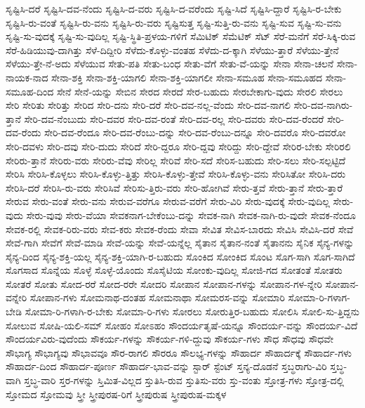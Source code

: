 {ಸೃಷ್ಟಿಸಿ-ದರೆ
ಸೃಷ್ಟಿಸಿ-ದವ-ನೆಂದು
ಸೃಷ್ಟಿಸಿ-ದ-ವರು
ಸೃಷ್ಟಿಸಿ-ದ-ವರೆಂದು
ಸೃಷ್ಟಿ-ಸಿದೆ
ಸೃಷ್ಟಿಸಿ-ದ್ದಾರೆ
ಸೃಷ್ಟಿಸಿ-ರ-ಬೇಕು
ಸೃಷ್ಟಿಸಿ-ರು-ವಂತೆ
ಸೃಷ್ಟಿಸಿ-ರು-ವನು
ಸೃಷ್ಟಿಸಿ-ರು-ವರು
ಸೃಷ್ಟಿಸುತ್ತ
ಸೃಷ್ಟಿ-ಸುತ್ತಿ-ರು-ವನು
ಸೃಷ್ಟಿ-ಸುವ
ಸೃಷ್ಟಿ-ಸು-ವನು
ಸೃಷ್ಟಿ-ಸು-ವುದಕ್ಕೆ
ಸೃಷ್ಟಿ-ಸು-ವುದಿಲ್ಲ
ಸೃಷ್ಟಿ-ಸ್ಥಿತಿ-ಪ್ರಳಯ-ಗಳಿಗೆ
ಸೆಮಿಟಿಕ್
ಸೆಮೆಟಿಕ್
ಸೆಟ್
ಸೆರೆ-ಮನೆಗೆ
ಸೆರೆ-ಸಿಕ್ಕಿ-ರುವ
ಸೆರೆ-ಹಿಡಿಯುವು-ದಾಗಿತ್ತು
ಸೆಳೆ-ದಿದ್ದೀರಿ
ಸೆಳೆದು-ಕೊಳ್ಳು-ವಂತಹ
ಸೆಳೆದು-ದ-ಕ್ಕಾಗಿ
ಸೆಳೆಯು-ತ್ತಾರೆ
ಸೆಳೆಯು-ತ್ತೇನೆ
ಸೆಳೆಯು-ತ್ತೇ-ನೆ-ಅದು
ಸೆಳೆಯುವ
ಸೇತು-ಪತಿ
ಸೇತು-ಬಂಧ
ಸೇತು-ವೆಗೆ
ಸೇತು-ವೆ-ಯನ್ನು
ಸೇನಾ
ಸೇನಾ-ಚಲನೆ
ಸೇನಾ-ನಾಯಕ-ನಾದ
ಸೇನಾ-ಶಕ್ತಿ
ಸೇನಾ-ಶಕ್ತಿ-ಯಾಗಲಿ
ಸೇನಾ-ಶಕ್ತಿ-ಯಾಗಲೀ
ಸೇನಾ-ಸಮೂಹ
ಸೇನಾ-ಸಮೂಹದ
ಸೇನಾ-ಸಮೂಹ-ದಿಂದ
ಸೇನೆ
ಸೇನೆ-ಯನ್ನು
ಸೇಬಿನ
ಸೇರದ
ಸೇರದೆ
ಸೇರ-ಬಹುದು
ಸೇರಬೇಕಾಗು-ವುದು
ಸೇರಲಿ
ಸೇರಲು
ಸೇರಿ
ಸೇರಿತು
ಸೇರಿತ್ತು
ಸೇರಿದ
ಸೇರಿ-ದನು
ಸೇರಿ-ದರೆ
ಸೇರಿ-ದವ-ನಲ್ಲ-ವೆಂದು
ಸೇರಿ-ದವ-ನಾಗಲಿ
ಸೇರಿ-ದವ-ನಾಗಿರು-ತ್ತಾನೆ
ಸೇರಿ-ದವ-ನೆಂಬುದು
ಸೇರಿ-ದವರ
ಸೇರಿ-ದವ-ರಂತೆ
ಸೇರಿ-ದವ-ರಲ್ಲ
ಸೇರಿ-ದವರು
ಸೇರಿ-ದವ-ರೆಂದರೆ
ಸೇರಿ-ದವ-ರೆಂದು
ಸೇರಿ-ದವ-ರೆಂದೂ
ಸೇರಿ-ದವ-ರೆಂಬು-ದನ್ನು
ಸೇರಿ-ದವ-ರೆಂಬು-ದನ್ನೂ
ಸೇರಿ-ದವರೊ
ಸೇರಿ-ದವರೋ
ಸೇರಿ-ದವಳು
ಸೇರಿ-ದವು
ಸೇರಿ-ದುದು
ಸೇರಿದೆ
ಸೇರಿ-ದ್ದರೂ
ಸೇರಿ-ದ್ದವು
ಸೇರಿದ್ದು
ಸೇರಿ-ದ್ದೇವೆ
ಸೇರಿರ-ಬೇಕು
ಸೇರಿರಲಿ
ಸೇರಿರು-ತ್ತಾನೆ
ಸೇರಿರು-ವರು
ಸೇರಿರು-ವೆವು
ಸೇರಿಲ್ಲ
ಸೇರಿವೆ
ಸೇರಿ-ಸದೆ
ಸೇರಿಸ-ಬಹುದು
ಸೇರಿ-ಸಲು
ಸೇರಿ-ಸಲ್ಪಟ್ಟಿದೆ
ಸೇರಿಸಿ
ಸೇರಿಸಿ-ಕೊಳ್ಳಲು
ಸೇರಿಸಿ-ಕೊಳ್ಳು-ತ್ತಿತ್ತು
ಸೇರಿಸಿ-ಕೊಳ್ಳು-ತ್ತೇವೆ
ಸೇರಿಸಿ-ಕೊಳ್ಳು-ವನು
ಸೇರಿಸಿತೋ
ಸೇರಿಸಿ-ದರು
ಸೇರಿಸಿ-ದರೆ
ಸೇರಿಸಿ-ರು-ವರು
ಸೇರಿಸಿವೆ
ಸೇರಿಸು-ತ್ತಿರು-ವರು
ಸೇರಿ-ಹೋಗಿವೆ
ಸೇರು-ತ್ತವೆ
ಸೇರು-ತ್ತಾನೆ
ಸೇರು-ತ್ತಾರೆ
ಸೇರುವ
ಸೇರು-ವಂತೆ
ಸೇರು-ವನು
ಸೇರುವ-ವರೆಗೂ
ಸೇರುವ-ವರೆಗೆ
ಸೇರು-ವಿರಿ
ಸೇರು-ವುದಕ್ಕೆ
ಸೇರು-ವುದಿಲ್ಲ
ಸೇರು-ವುದು
ಸೇರು-ವುವು
ಸೇರು-ವೆಯಾ
ಸೇವಕನಾಗ-ಬೇಕೆಂಬು-ದನ್ನು
ಸೇವಕ-ನಾಗಿ
ಸೇವಕ-ನಾಗಿ-ರು-ವುದೇ
ಸೇವಕ-ನೆಂದೂ
ಸೇವಕ-ರಲ್ಲಿ
ಸೇವಕ-ರಿರು-ವರು
ಸೇವ-ಕರು
ಸೇವಕ-ರೆಂದು
ಸೇವಾ
ಸೇವಿತ
ಸೇವಿಸ-ಬಾರದು
ಸೇವಿಸಿ
ಸೇವಿಸಿ-ದರೆ
ಸೇವೆ
ಸೇವೆ-ಗಾಗಿ
ಸೇವೆಗೆ
ಸೇವೆ-ಮಾಡಿ
ಸೇವೆ-ಯನ್ನು
ಸೇವೆ-ಯನ್ನೆಲ್ಲ
ಸೈತಾನ
ಸೈತಾನ-ನಂತೆ
ಸೈತಾನನು
ಸೈನಿಕ
ಸೈನ್ಯ-ಗಳನ್ನು
ಸೈನ್ಯ-ದಿಂದ
ಸೈನ್ಯ-ಶಕ್ತಿ-ಯಲ್ಲ
ಸೈನ್ಯ-ಶಕ್ತಿ-ಯಾಗಿ-ರ-ಬಹುದು
ಸೊಂಕಿದ
ಸೋಂಕಿದ
ಸೊಂಟ
ಸೊಗ-ಸಾಗಿ
ಸೊಗ-ಸಾಗಿದೆ
ಸೊಗಸಾದ
ಸೊನ್ನೆಯ
ಸೊಳ್ಳೆ
ಸೊಳ್ಳೆ-ಯೊಂದು
ಸೊಸೈಟಿಯ
ಸೋಂಕು-ವುದಿಲ್ಲ
ಸೋಜಿ-ಗದ
ಸೋತಂತೆ
ಸೋತರು
ಸೋತರೆ
ಸೋತು
ಸೋದ-ರರೆ
ಸೋದ-ರರೇ
ಸೋದರಿ
ಸೋಪಾನ
ಸೋಪಾನ-ಗಳನ್ನು
ಸೋಪಾನ-ಗಳ-ನ್ನೇರಿ
ಸೋಪಾನ-ವನ್ನೇರಿ
ಸೋಪಾನ-ಗಳು
ಸೋಮನಾಥ-ದಂತಹ
ಸೋಮನಾಥಾ
ಸೋಮರಸ-ವನ್ನು
ಸೋಮಾರಿ
ಸೋಮಾ-ರಿ-ಗಳಾಗ-ಬೇಡಿ
ಸೋಮಾ-ರಿ-ಗಳಾಗಿ-ರ-ಬೇಕು
ಸೋಮಾ-ರಿ-ಗಳು
ಸೋರಲು
ಸೋರುತ್ತಿರ-ಬಹುದು
ಸೋಲಿಸಿ
ಸೋಲಿ-ಸು-ತ್ತಿದ್ದನು
ಸೋಲುವ
ಸೋಷಿ-ಯಲಿ-ಸಮ್
ಸೋಹಂ
ಸೋಽಹಂ
ಸೌಂದರ್ಯತೃಷೆ-ಯನ್ನೂ
ಸೌಂದರ್ಯ-ವನ್ನು
ಸೌಂದರ್ಯ-ವಿದೆ
ಸೌಂದರ್ಯವಿರು-ವುದೆಂದು
ಸೌಕರ್ಯ-ಗಳನ್ನು
ಸೌಕರ್ಯ-ಗಳಿ-ದ್ದುವು
ಸೌಕರ್ಯ-ಗಳು
ಸೌಧ
ಸೌಧವು
ಸೌಧವೇ
ಸೌಭಾಗ್ಯ
ಸೌಭಾಗ್ಯವು
ಸೌಭಾವವೂ
ಸೌರ-ರಾಗಲಿ
ಸೌರರೂ
ಸೌಲಭ್ಯ-ಗಳನ್ನು
ಸೌಹಾರ್ದ
ಸೌಹಾರ್ದಕ್ಕೆ
ಸೌಹಾರ್ದ-ಗಳು
ಸೌಹಾರ್ದ-ದಿಂದ
ಸೌಹಾರ್ದ-ಪೂರ್ಣ
ಸೌಹಾರ್ದ-ಭಾವ-ವನ್ನು
ಸ್ಟಾರ್
ಸ್ಟೆಂಟ್
ಸ್ತನ್ಯ-ದೊಡನೆ
ಸ್ತಬ್ಧರಾಗು-ವಿರಿ
ಸ್ತಬ್ಧ-ವಾಗಿ
ಸ್ತಬ್ಧ-ವಾರಿ
ಸ್ತರ-ಗಳನ್ನು
ಸ್ತಿಮಿತ-ವಿಲ್ಲದ
ಸ್ತುತಿಸಿ-ರುವ
ಸ್ತುತಿಸು-ವರು
ಸ್ತು-ವಂತು
ಸ್ತೋತ್ರ-ಗಳು
ಸ್ತೋತ್ರ-ದಲ್ಲಿ
ಸ್ತೋಮದ
ಸ್ತೋಮವು
ಸ್ತ್ರೀ
ಸ್ತ್ರೀಪುರಷ-ರಿಗೆ
ಸ್ತ್ರೀಪುರುಷ
ಸ್ತ್ರೀಪುರುಷ-ಮಕ್ಕಳ
}
